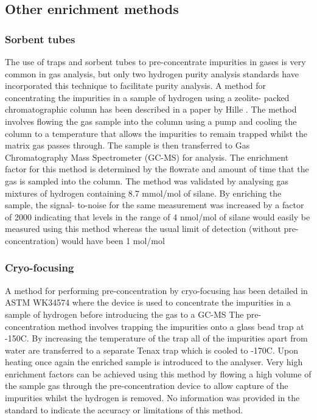\subsection{Other enrichment methods}
\subsubsection{Sorbent tubes}
The use of traps and sorbent tubes to pre-concentrate impurities in gases is very common in gas analysis, 
but only two hydrogen purity analysis standards have incorporated this technique to facilitate purity analysis. 
A method for concentrating the impurities in a sample of hydrogen using a zeolite- packed chromatographic 
column has been described in a paper by Hille \cite{Hille1990a}. The method involves flowing the gas sample into the column 
using a pump and cooling the column to a temperature that allows the impurities to remain trapped whilst the 
matrix gas passes through. The sample is then transferred to Gas Chromatography Mass Spectrometer (GC-MS) for analysis. The enrichment factor for 
this method is determined by the flowrate and amount of time that the gas is sampled into the column. 
The method was validated by analysing gas mixtures of hydrogen containing 8.7 mmol/mol of silane. 
By enriching the sample, the signal- to-noise for the same measurement was increased by a factor of 2000 
indicating that levels in the range of 4 nmol/mol of silane would easily be measured using this method 
whereas the usual limit of detection (without pre-concentration) would have been 1 \textmu mol/mol

\subsubsection{Cryo-focusing}
A method for performing pre-concentration by cryo-focusing has been detailed in ASTM WK34574 
where the device is used to concentrate the impurities in a sample of hydrogen before introducing 
the gas to a GC-MS \cite{Murugan2015} The pre-concentration method involves trapping the impurities onto a glass bead trap 
at -150\textdegree C. By increasing the temperature of the trap all of the impurities apart from water 
are transferred to a separate Tenax trap which is cooled to -170\textdegree C. 
Upon heating once again the enriched sample is introduced to the analyser. 
Very high enrichment factors can be achieved using this method by flowing a high volume of the sample 
gas through the pre-concentration device to allow capture of the impurities whilst the hydrogen is removed. 
No information was provided in the standard to indicate the accuracy or limitations of this method.

